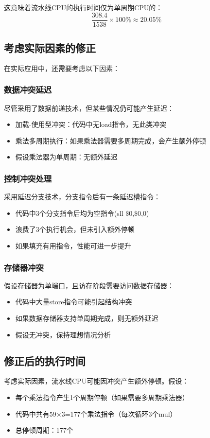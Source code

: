 \documentclass[12pt,a4paper]{article}
\begin{document}
这意味着流水线CPU的执行时间仅为单周期CPU的：
\[
\frac{308.4}{1538} \times 100\% \approx 20.05\%
\]

\subsection{考虑实际因素的修正}
在实际应用中，还需要考虑以下因素：

\subsubsection{数据冲突延迟}
尽管采用了数据前递技术，但某些情况仍可能产生延迟：
\begin{itemize}
    \item 加载-使用型冲突：代码中无load指令，无此类冲突
    \item 乘法多周期执行：如果乘法器需要多周期完成，会产生额外停顿
    \item 假设乘法器为单周期：无额外延迟
\end{itemize}

\subsubsection{控制冲突处理}
采用延迟分支技术，分支指令后有一条延迟槽指令：
\begin{itemize}
    \item 代码中3个分支指令后均为空指令(sll \$0,\$0,0)
    \item 浪费了3个执行机会，但未引入额外停顿
    \item 如果填充有用指令，性能可进一步提升
\end{itemize}

\subsubsection{存储器冲突}
假设存储器为单端口，且访存阶段需要访问数据存储器：
\begin{itemize}
    \item 代码中大量store指令可能引起结构冲突
    \item 如果数据存储器支持单周期完成，则无额外延迟
    \item 假设无冲突，保持理想情况分析
\end{itemize}

\subsection{修正后的执行时间}
考虑实际因素，流水线CPU可能因冲突产生额外停顿。假设：
\begin{itemize}
    \item 每个乘法指令产生1个周期停顿（如果需要多周期乘法器）
    \item 代码中共有59×3=177个乘法指令（每次循环3个mul）
    \item 总停顿周期：177个
\end{itemize}
\end{document}
